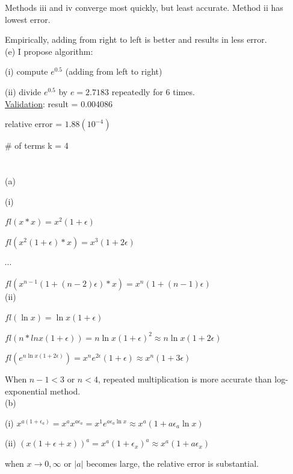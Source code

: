 \documentclass[10pt]{article}
\begin{document}
Methods iii and iv converge most quickly, but least accurate. Method ii has lowest error.

Empirically, adding from right to left is better and results in less error.\\

(e) I propose algorithm:

(i) compute $e^{0.5}$ (adding from left to right)

(ii) divide $e^{0.5}$ by $e=2.7183$ repeatedly for 6 times.\\

\underline{Validation}: result = 0.004086

relative error = $1.88(10^{-4})$

\# of terms k = 4

\section{}

(a)

(i) 

$fl(x*x)=x^2(1+\epsilon)$

$fl(x^2(1+\epsilon)*x)=x^3(1+2\epsilon)$

$\cdots$

$fl(x^{n-1}(1+(n-2)\epsilon)*x)=x^n(1+(n-1)\epsilon)$\\

(ii)

$fl(\ln x)=\ln x(1+\epsilon)$

$fl(n*ln x(1+\epsilon))=n\ln x (1+\epsilon)^2\approx n\ln x (1+2\epsilon)$

$fl(e^{n\ln x(1+2\epsilon)})=x^n e^{2\epsilon}(1+\epsilon)\approx x^n(1+3\epsilon)$

When $n-1<3$ or $n<4$, repeated multiplication is more accurate than log-exponential method.\\

(b)

(i) $x^{a(1+\epsilon_a)}=x^ax^{a\epsilon_a}=x^1e^{a\epsilon_a\ln x}\approx x^a(1+a\epsilon_a\ln x)$

(ii) $(x(1+\epsilon+x))^a=x^a(1+\epsilon_x)^a\approx x^a(1+a\epsilon_x)$

when $x\rightarrow 0,\infty$ or $|a|$ becomes large, the relative error is substantial.\\

\section{}
\end{document}
